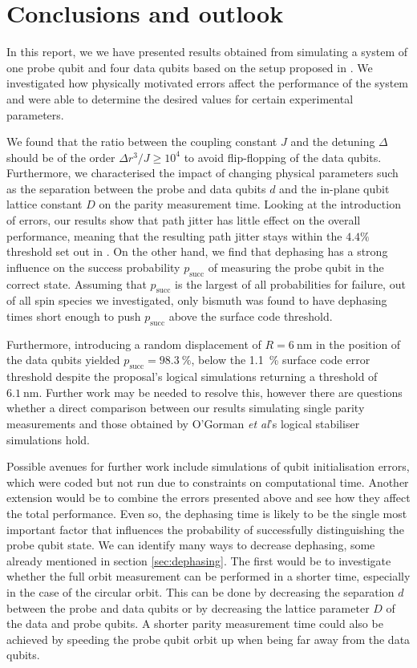 
\section{Conclusions and outlook} \label{sec:conclusions}
In this report, we we have presented results obtained from simulating a system of one probe qubit and four data qubits based on the setup proposed in \cite{OGorman2016}. We investigated how physically motivated errors affect the performance of the system and were able to determine the desired values for certain experimental parameters. 

We found that the ratio between the coupling constant $J$ and the detuning $\Delta$ should be of the order $\Delta r^3/J \ge 10^4$ to avoid flip-flopping of the data qubits. Furthermore, we characterised the impact of changing physical parameters such as the separation between the probe and data qubits $d$ and the in-plane qubit lattice constant $D$ on the parity measurement time.  
Looking at the introduction of errors, our results show that path jitter has little effect on the overall performance, meaning that the resulting path jitter stays within the $4.4\%$ threshold set out in \cite{OGorman2016}. On the other hand, we find that dephasing has a strong influence on the success probability $p_{\textrm{succ}}$ of measuring the probe qubit in the correct state. Assuming that $p_{\textrm{succ}}$ is the largest of all probabilities for failure, out of all spin species we investigated, only bismuth was found to have dephasing times short enough to push $p_{\textrm{succ}}$ above the surface code threshold.

Furthermore, introducing a random displacement of $R = \SI{6}{\nano\metre}$ in the position of the data qubits yielded $p_{\textrm{succ}} = \SI{98.3}{\percent}$, below the \SI{1.1}{\percent} surface code error threshold \hbox{\cite{Wang2011,Fowler2012}} despite the proposal's logical simulations returning a threshold of $\SI{6.1}{\nano\metre}$. Further work may be needed to resolve this, however there are questions whether a direct comparison between our results simulating single parity measurements and those obtained by O'Gorman \textit{et al}'s logical stabiliser simulations hold.




Possible avenues for further work include simulations of qubit initialisation errors, which were coded but not run due to constraints on computational time. Another extension would be to combine the errors presented above and see how they affect the total performance. Even so, the dephasing time is likely to be the single most important factor that influences the probability of successfully distinguishing the probe qubit state. We can identify many ways to decrease dephasing, some already mentioned in section \ref{sec:dephasing}. The first would be to investigate whether the full orbit measurement can be performed in a shorter time, especially in the case of the circular orbit. This can be done by decreasing the separation $d$ between the probe and data qubits or by decreasing the lattice parameter $D$ of the data and probe qubits. A shorter parity measurement time could also be achieved by speeding the probe qubit orbit up when being far away from the data qubits. 


